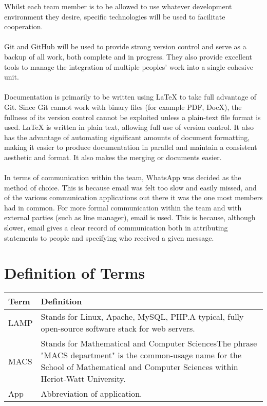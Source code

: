 \documentclass[11pt, a4paper]{report}
\begin{document}
Whilst each team member is to be allowed to use whatever development environment they desire, specific technologies will be used to facilitate cooperation.\\
\\
Git and GitHub will be used to provide strong version control and serve as a backup of all work, both complete and in progress. They also provide excellent tools to manage the integration of multiple peoples' work into a single cohesive unit.\\
\\
Documentation is primarily to be written using LaTeX to take full advantage of Git. Since Git cannot work with binary files (for example PDF, DocX), the fullness of its version control cannot be exploited unless a plain-text file format is used. LaTeX is written in plain text, allowing full use of version control. It also has the advantage of automating significant amounts of document formatting, making it easier to produce documentation in parallel and maintain a consistent aesthetic and format. It also makes the merging or documents easier.\\
\\
In terms of communication within the team, WhatsApp was decided as the method of choice. This is because email was felt too slow and easily missed, and of the various communication applications out there it was the one most members had in common. For more formal communication within the team and with external parties (such as line manager), email is used. This is because, although slower, email gives a clear record of communication both in attributing statements to people and specifying who received a given message.


\section{Definition of Terms} \label{subsec:Definitions}
\vspace{1cm}

\begin{tabulary}{1.2\textwidth}{l L}
Term & Definition \\ \midrule

LAMP & Stands for Linux, Apache, MySQL, PHP.\newline A typical, fully open-source software stack for web servers. \\ \midrule
MACS & Stands for Mathematical and Computer Sciences\newline The phrase "MACS department" is the common-usage name for the School of Mathematical and Computer Sciences within Heriot-Watt University. \\ \midrule
App & Abbreviation of application.
\end{tabulary}

\nocite{NoRisks}

\printbibliography
\end{document}
